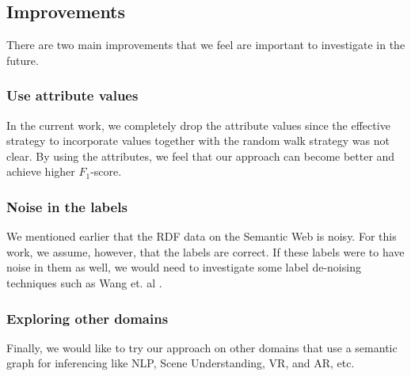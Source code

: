 \documentclass[runningheads,a4paper]{IEEEtran}
\begin{document}
\subsection{Improvements}
There are two main improvements that we feel are important to investigate in the future. 

\subsubsection{Use attribute values} 
In the current work, we completely drop the attribute values since the effective strategy to incorporate values together with the random walk strategy was not clear. By using the attributes, we feel that our approach can become better and achieve higher $F_1$-score.

\subsubsection{Noise in the labels}
We mentioned earlier that the RDF data on the Semantic Web is noisy. For this work, we assume, however, that the labels are correct. If these labels were to have noise in them as well, we would need to investigate some label de-noising techniques such as Wang et. al \cite{wang2014label}.

\subsubsection{Exploring other domains}
Finally, we would like to try our approach on other domains that use a semantic graph for inferencing like NLP, Scene Understanding, VR, and AR, etc.


\end{document}
